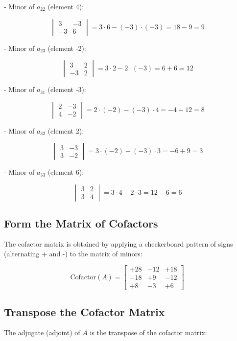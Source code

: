 \documentclass{article}
\begin{document}
- Minor of \(a_{22}\) (element 4):

\[
\begin{vmatrix}
3 & -3 \\
-3 & 6
\end{vmatrix} = 3 \cdot 6 - (-3) \cdot (-3) = 18 - 9 = 9
\]

- Minor of \(a_{23}\) (element -2):

\[
\begin{vmatrix}
3 & 2 \\
-3 & 2
\end{vmatrix} = 3 \cdot 2 - 2 \cdot (-3) = 6 + 6 = 12
\]

- Minor of \(a_{31}\) (element -3):

\[
\begin{vmatrix}
2 & -3 \\
4 & -2
\end{vmatrix} = 2 \cdot (-2) - (-3) \cdot 4 = -4 + 12 = 8
\]

- Minor of \(a_{32}\) (element 2):

\[
\begin{vmatrix}
3 & -3 \\
3 & -2
\end{vmatrix} = 3 \cdot (-2) - (-3) \cdot 3 = -6 + 9 = 3
\]

- Minor of \(a_{33}\) (element 6):

\[
\begin{vmatrix}
3 & 2 \\
3 & 4
\end{vmatrix} = 3 \cdot 4 - 2 \cdot 3 = 12 - 6 = 6
\]

\subsection{Form the Matrix of Cofactors}
The cofactor matrix is obtained by applying a checkerboard pattern of signs (alternating + and -) to the matrix of minors:

\[
\text{Cofactor}(A) = \begin{bmatrix}
+28 & -12 & +18 \\
-18 & +9 & -12 \\
+8 & -3 & +6
\end{bmatrix}
\]

\subsection{Transpose the Cofactor Matrix}
The adjugate (adjoint) of \(A\) is the transpose of the cofactor matrix:
\end{document}
